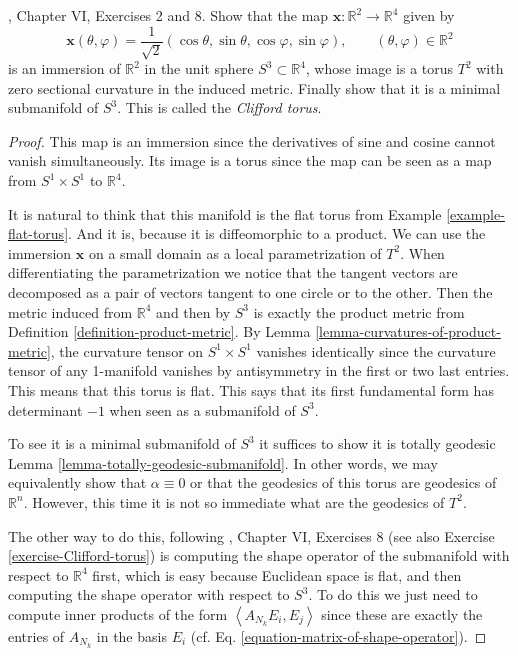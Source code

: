 \begin{exercise}
\label{exercise-Clifford-torus}
\cite{doc}, Chapter VI, Exercises 2 and 8. Show that the map
$\mathbf{x}:\mathbb{R}^2\to\mathbb{R}^4$ given by
$$
\mathbf{x}(\theta,\varphi)
=\frac{1}{\sqrt{2}}(\cos\theta,\sin\theta,\cos\varphi,\sin\varphi),
\qquad(\theta,\varphi)\in\mathbb{R}^2
$$
is an immersion of $\mathbb{R}^2$ in the unit sphere $S^3\subset\mathbb{R}^4$,
whose image is a torus $T^2$ with zero sectional curvature in the induced
metric. Finally show that it is a minimal submanifold of $S^3$. This is called
the {\it Clifford torus}.
\end{exercise}

\begin{proof}
This map is an immersion since the derivatives of sine and cosine cannot vanish
simultaneously. Its image is a torus since the map can be seen as a map
from $S^1\times S^1$ to $\mathbb{R}^4$.

It is natural to think that this manifold is the flat torus from Example
\ref{example-flat-torus}. And it is, because it is diffeomorphic to a product.
We can use the immersion $\mathbf{x}$ on a small domain as a local
parametrization of $T^2$.  When differentiating the parametrization we notice
that the tangent vectors are decomposed as a pair of vectors tangent to one
circle or to the other. Then the metric induced from $\mathbb{R}^4$ and then by
$S^3$ is exactly the product metric from Definition
\ref{definition-product-metric}. By Lemma 
\ref{lemma-curvatures-of-product-metric}, the curvature tensor on $S^1\times
S^1$ vanishes identically since the curvature tensor of any 1-manifold vanishes
by antisymmetry in the first or two last entries. This means that this torus is
flat. This says that its first fundamental form has determinant $-1$ when seen
as a submanifold of $S^3$.

To see it is a minimal submanifold of $S^3$ it suffices to show it is totally
geodesic Lemma \ref{lemma-totally-geodesic-submanifold}. In other words, we may
equivalently show that $\alpha\equiv0$ or that the geodesics of this torus are
geodesics of $\mathbb{R}^n$. However, this time it is not so immediate what are
the geodesics of $T^2$.

The other way to do this, following \cite{doc}, Chapter VI, Exercises 8 (see also
Exercise \ref{exercise-Clifford-torus}) is computing the shape operator of the
submanifold with respect to $\mathbb{R}^4$ first, which is easy because
Euclidean space is flat, and then computing the shape operator with respect to
$S^3$. To do this we just need to compute inner products of the form
$\left<A_{N_k}E_i,E_j\right>$ since these are exactly the entries of $A_{N_k}$
in the basis $E_i$ (cf. Eq. \ref{equation-matrix-of-shape-operator}).


\end{proof}
